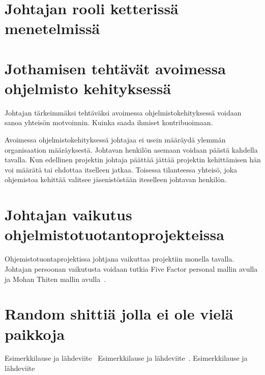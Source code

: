 \documentclass[finnish]{tktltiki2}
\theoremstyle{definition}
\theoremstyle{remark}
\begin{document}
\section{Johtajan rooli ketterissä menetelmissä}



\section{Jothamisen tehtävät avoimessa ohjelmisto kehityksessä}

Johtajan tärkeimmäksi tehtäväksi avoimessa ohjelmistokehityksessä  voidaan sanoa yhteisön motvoinnin. Kuinka saada ihmiset kontribuoimaan.~\cite{Li:2006:MOS:1125170.1125182}

Avoimessa ohjelmistokehityksessä johtajaa ei usein määräydä ylemmän organisaation määräyksestä. Johtavan henkilön asemaan voidaan päästä kahdella tavalla. Kun edellinen projektin johtaja päättää jättää projektin kehittämisen hän voi määrätä tai ehdottaa itselleen jatkaa. Toisessa tilanteessa yhteisö, joka ohjemistoa kehittää valitsee jäsenistöstään iteselleen johtavan henkilön. ~\cite{Li:2006:MOS:1125170.1125182}

\section{Johtajan vaikutus ohjelmistotuotantoprojekteissa}

Ohjemistotuontaprojektissa johtjana vaikuttaa projektiin monella tavalla. Johtajan persoonan vaikutusta voidaan tutkia Five Factor personal mallin avulla ja Mohan Thiten mallin avulla~\cite{Wang:2009:PMP:1639950.1640049}. 


\section{Random shittiä jolla ei ole vielä paikkoja}







 






Esimerkkilause ja lähdeviite~\cite{McLeod:2011:FAS:1978802.1978803}
Esimerkkilause ja lähdeviite~\cite{Guo:2008:SSP:1414004.1414046}.
Esimerkkilause ja lähdeviite~\cite{Wang:2010:PPP:1810295.1810302}





%
%
% 
%



\end{document}
